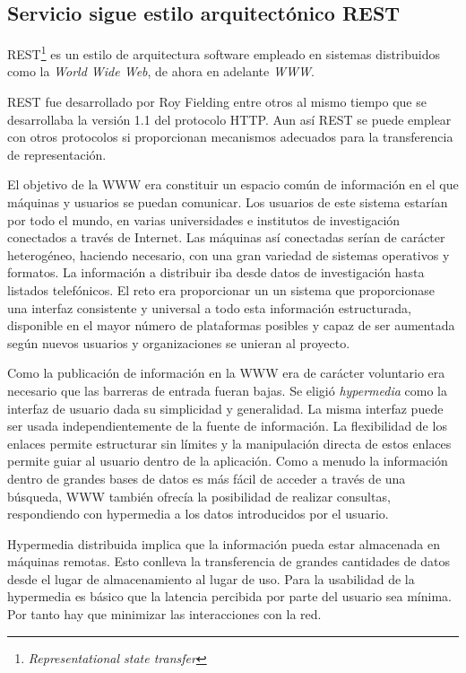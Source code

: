\subsection{Servicio sigue estilo arquitectónico REST}
REST\footnote{\emph{Representational state transfer}} es un estilo de
arquitectura software empleado en sistemas distribuidos como la
\emph{World Wide Web}, de ahora en adelante \emph{WWW}.

REST fue desarrollado por Roy Fielding entre otros al mismo tiempo que
se desarrollaba la versión 1.1 del protocolo HTTP. Aun así REST se
puede emplear con otros protocolos si proporcionan mecanismos
adecuados para la transferencia de representación.

El objetivo de la WWW era constituir un espacio común de información
en el que máquinas y usuarios se puedan comunicar.  Los usuarios de
este sistema estarían por todo el mundo, en varias universidades e
institutos de investigación conectados a través de Internet. Las
máquinas así conectadas serían de carácter heterogéneo, haciendo
necesario, con una gran variedad de sistemas operativos y formatos. La
información a distribuir iba desde datos de investigación hasta
listados telefónicos. El reto era proporcionar un un sistema que
proporcionase una interfaz consistente y universal a todo esta
información estructurada, disponible en el mayor número de plataformas
posibles y capaz de ser aumentada según nuevos usuarios y
organizaciones se unieran al proyecto.

Como la publicación de información en la WWW era de carácter
voluntario era necesario que las barreras de entrada fueran bajas. Se
eligió \emph{hypermedia} como la interfaz de usuario dada su
simplicidad y generalidad. La misma interfaz puede ser usada
independientemente de la fuente de información. La flexibilidad de los
enlaces permite estructurar sin límites y la manipulación directa de
estos enlaces permite guiar al usuario dentro de la aplicación. Como a
menudo la información dentro de grandes bases de datos es más fácil de
acceder a través de una búsqueda, WWW también ofrecía la posibilidad
de realizar consultas, respondiendo con hypermedia a los datos
introducidos por el usuario.

Hypermedia distribuida implica que la información pueda estar
almacenada en máquinas remotas. Esto conlleva la transferencia de
grandes cantidades de datos desde el lugar de almacenamiento al lugar
de uso. Para la usabilidad de la hypermedia es básico que la latencia
percibida por parte del usuario sea mínima. Por tanto hay que
minimizar las interacciones con la red.

